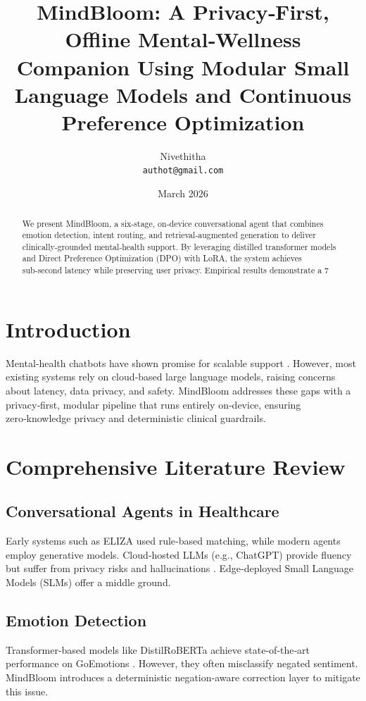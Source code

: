 \documentclass[12pt,twoside]{article}
\title{\textbf{MindBloom: A Privacy‑First, Offline Mental‑Wellness Companion Using Modular Small Language Models and Continuous Preference Optimization}}
\author{Nivethitha \\ \texttt{authot@gmail.com}}
\date{March 2026}
\begin{document}
\maketitle

\begin{abstract}
We present MindBloom, a six‑stage, on‑device conversational agent that combines emotion detection, intent routing, and retrieval‑augmented generation to deliver clinically‑grounded mental‑health support. By leveraging distilled transformer models and Direct Preference Optimization (DPO) with LoRA, the system achieves sub‑second latency while preserving user privacy. Empirical results demonstrate a 7 %
\end{abstract}

\section{Introduction}
Mental‑health chatbots have shown promise for scalable support \citep{fitzpatrick2017woebot, inkster2018wysa}. However, most existing systems rely on cloud‑based large language models, raising concerns about latency, data privacy, and safety. MindBloom addresses these gaps with a privacy‑first, modular pipeline that runs entirely on‑device, ensuring zero‑knowledge privacy and deterministic clinical guardrails.

\section{Comprehensive Literature Review}
\subsection{Conversational Agents in Healthcare}
Early systems such as ELIZA \citep{weizenbaum1966eliza} used rule‑based matching, while modern agents employ generative models. Cloud‑hosted LLMs (e.g., ChatGPT) provide fluency but suffer from privacy risks and hallucinations \citep{vaswani2017attention, devlin2018bert}. Edge‑deployed Small Language Models (SLMs) offer a middle ground.

\subsection{Emotion Detection}
Transformer‑based models like DistilRoBERTa \citep{sanh2019distilbert} achieve state‑of‑the‑art performance on GoEmotions \citep{demszky2020goemotions}. However, they often misclassify negated sentiment. MindBloom introduces a deterministic negation‑aware correction layer to mitigate this issue.
\end{document}
